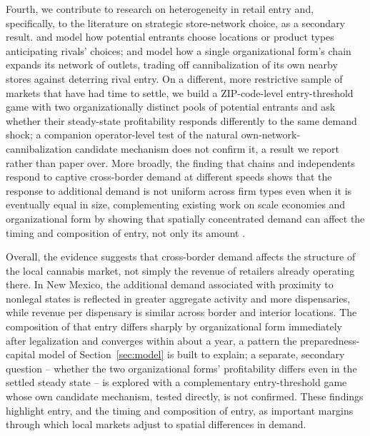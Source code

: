\documentclass[english,12pt]{article}
\begin{document}
Fourth, we contribute to research on heterogeneity in retail entry and, specifically, to the literature on strategic store-network choice, as a secondary result. \citet{Seim2006} and \citet{Mazzeo2002} model how potential entrants choose locations or product types anticipating rivals' choices; \citet{Nishida2008} and \citet{Holmes2011} model how a single organizational form's chain expands its network of outlets, trading off cannibalization of its own nearby stores against deterring rival entry. On a different, more restrictive sample of markets that have had time to settle, we build a ZIP-code-level entry-threshold game with two organizationally distinct pools of potential entrants and ask whether their steady-state profitability responds differently to the same demand shock; a companion operator-level test of the natural own-network-cannibalization candidate mechanism does not confirm it, a result we report rather than paper over. More broadly, the finding that chains and independents respond to captive cross-border demand at different speeds shows that the response to additional demand is not uniform across firm types even when it is eventually equal in size, complementing existing work on scale economies and organizational form by showing that spatially concentrated demand can affect the timing and composition of entry, not only its amount \citep{Sadun2015}.

Overall, the evidence suggests that cross-border demand affects the structure of the local cannabis market, not simply the revenue of retailers already operating there. In New Mexico, the additional demand associated with proximity to nonlegal states is reflected in greater aggregate activity and more dispensaries, while revenue per dispensary is similar across border and interior locations. The composition of that entry differs sharply by organizational form immediately after legalization and converges within about a year, a pattern the preparedness-capital model of Section~\ref{sec:model} is built to explain; a separate, secondary question -- whether the two organizational forms' profitability differs even in the settled steady state -- is explored with a complementary entry-threshold game whose own candidate mechanism, tested directly, is not confirmed. These findings highlight entry, and the timing and composition of entry, as important margins through which local markets adjust to spatial differences in demand.
\end{document}
